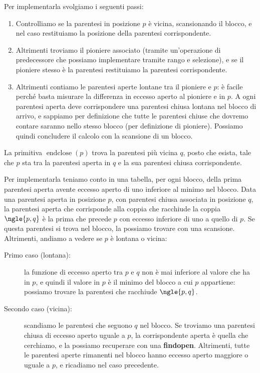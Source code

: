 \documentclass[\main/main.tex]{subfiles}
\begin{document}
\begin{multicols}{2}
\begin{definition}[Findclose]
    Per implementarla svolgiamo i seguenti passi:
    \begin{enumerate}
        \item Controlliamo se la parentesi in posizione \(p\) è vicina, scansionando il blocco, e nel caso restituiamo la posizione della parentesi corrispondente.
        \item Altrimenti troviamo il pioniere associato (tramite un'operazione di predecessore che possiamo implementare tramite rango e selezione), e se il pioniere stesso è la parentesi restituiamo la parentesi corrispondente. 
        \item Altrimenti contiamo le parentesi aperte lontane tra il pioniere e \(p\): è facile perché basta misurare la differenza in eccesso aperto al pioniere e in \(p\). A ogni parentesi aperta deve corrispondere una parentesi chiusa lontana nel blocco di arrivo, e sappiamo per definizione che tutte le parentesi chiuse che dovremo contare saranno nello stesso blocco (per definizione di pioniere). Possiamo quindi concludere il calcolo con la scansione di un blocco.
    \end{enumerate}
\end{definition}
\begin{definition}[Endclose]
     La primitiva \(\operatorname{endclose}(p)\) trova la parentesi più vicina \(q\), posto che esista, tale che \(p\) sta tra la parentesi aperta in \(q\) e la sua parentesi chiusa corrispondente.
     
     Per implementarla teniamo conto in una tabella, per ogni blocco, della prima parentesi aperta avente eccesso aperto di uno inferiore al minimo nel blocco. Data una parentesi aperta in posizione \(p\), con parentesi chiusa associata in posizione \(q\), la parentesi aperta che corrisponde alla coppia che racchiude la coppia \(\ngle{p, q}\) è la prima che precede \(p\) con eccesso inferiore di uno a quello di \(p\). Se questa parentesi si trova nel blocco, la possiamo trovare con una scansione. Altrimenti, andiamo a vedere se \(p\) è lontana o vicina:
     \begin{description}
        \item[Primo caso (lontana):] la funzione di eccesso aperto tra \(p\) e \(q\) non è mai inferiore al valore che ha in \(p\), e quindi il valore in \(p\) è il minimo del blocco a cui \(p\) appartiene: possiamo trovare la parentesi che racchiude \(\ngle{p, q}\).
        \item[Secondo caso (vicina):] scandiamo le parentesi che seguono \(q\) nel blocco. Se troviamo una parentesi chiusa di eccesso aperto uguale a \(p\), la corrispondente aperta è quella che cerchiamo, e la possiamo recuperare con una \textbf{findopen}. Altrimenti, tutte le parentesi aperte rimanenti nel blocco hanno eccesso aperto maggiore o uguale a \(p\), e ricadiamo nel caso precedente.
     \end{description}
\end{definition}
\end{multicols}
\end{document}
